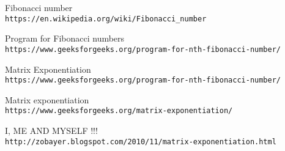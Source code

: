 \documentclass{article}
\begin{document}
\begin{thebibliography}{9}
Fibonacci number
\\\texttt{https://en.wikipedia.org/wiki/Fibonacci\_number}
 
Program for Fibonacci numbers
\\\texttt{https://www.geeksforgeeks.org/program-for-nth-fibonacci-number/}
 
Matrix Exponentiation
\\\texttt{https://www.geeksforgeeks.org/program-for-nth-fibonacci-number/}

Matrix exponentiation
\\\texttt{https://www.geeksforgeeks.org/matrix-exponentiation/}

I, ME AND MYSELF !!!
\\\texttt{http://zobayer.blogspot.com/2010/11/matrix-exponentiation.html}

\end{thebibliography}
\end{document}
